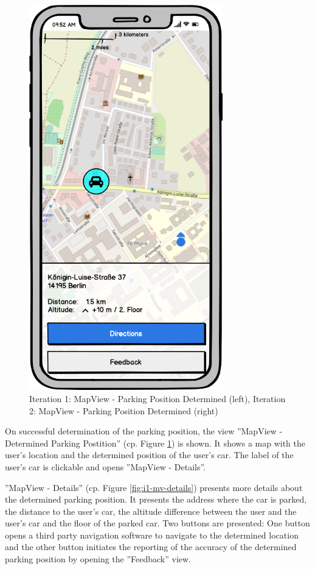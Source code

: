 \begin{figure}[h]
\begin{minipage}[b]{0.45\textwidth}
    \includegraphics[width=0.75\textwidth]{images/UI/Iteration2-MapView-ParkingPositionDetermined.png}
  \end{minipage}
  \caption{Iteration 1: MapView - Parking Position Determined (left), Iteration 2: MapView - Parking Position Determined (right)}
  \label{fig:i1-i2}
\end{figure}



On successful determination of the parking position, the view ''MapView - Determined Parking Postition'' (cp. Figure \ref{fig:i1-i2}) is shown. It shows a map with the user's location and the determined position of the user's car. The label of the user's car is clickable and opens ''MapView - Details''. 

''MapView - Details'' (cp. Figure \ref{fig:i1-mv-details}) presents more details about the determined parking position. It presents the address where the car is parked, the distance to the user's car, the altitude difference between the user and the user's car and the floor of the parked car. Two buttons are presented: One button opens a third party navigation software to navigate to the determined location and the other button initiates the reporting of the accuracy of the determined parking position by opening the ''Feedback'' view.

